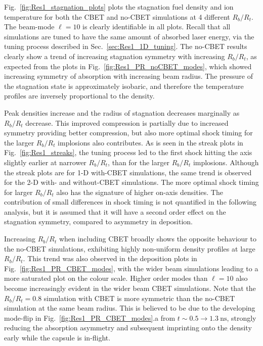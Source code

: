 Fig.~\ref{fig:Res1_stagnation_plots} plots the stagnation fuel density and ion temperature for both the \ac{CBET} and no-\ac{CBET} simulations at 4 different $R_b/R_t$.
The beam-mode $\ell=10$ is clearly identifiable in all plots.
Recall that all simulations are tuned to have the same amount of absorbed laser energy, via the tuning process described in Sec.~\ref{sec:Res1_1D_tuning}.
The no-\ac{CBET} results clearly show a trend of increasing stagnation symmetry with increasing $R_b/R_t$, as expected from the plots in Fig.~\ref{fig:Res1_PR_noCBET_modes}, which showed increasing symmetry of absorption with increasing beam radius.
The pressure of the stagnation state is approximately isobaric, and therefore the temperature profiles are inversely proportional to the density.

Peak densities increase and the radius of stagnation decreases marginally as $R_b/R_t$ decrease.
This improved compression is partially due to increased symmetry providing better compression, but also more optimal shock timing for the larger $R_b/R_t$ implosions also contributes.
As is seen in the streak plots in Fig.~\ref{fig:Res1_streaks}, the tuning process led to the first shock hitting the axis slightly earlier at narrower $R_b/R_t$, than for the larger $R_b/R_t$ implosions.
Although the streak plots are for 1-D with-\ac{CBET} simulations, the same trend is observed for the 2-D with- and without-\ac{CBET} simulations.
The more optimal shock timing for larger $R_b/R_t$ also has the signature of higher on-axis densities.
The contribution of small differences in shock timing is not quantified in the following analysis, but it is assumed that it will have a second order effect on the stagnation symmetry, compared to asymmetry in deposition.

Increasing $R_b/R_t$ when including \ac{CBET} broadly shows the opposite behaviour to the no-\ac{CBET} simulations, exhibiting highly non-uniform density profiles at large $R_b/R_t$.
This trend was also observed in the deposition plots in Fig.~\ref{fig:Res1_PR_CBET_modes}, with the wider beam simulations leading to a more saturated plot on the colour scale.
Higher order modes than $\ell=10$ also become increasingly evident in the wider beam \ac{CBET} simulations.
Note that the $R_b/R_t=0.8$ simulation with \ac{CBET} is more symmetric than the no-\ac{CBET} simulation at the same beam radius.
This is believed to be due to the developing mode-flip in Fig.~\ref{fig:Res1_PR_CBET_modes}.a from $t\sim 0.5\rightarrow 1.3\ \text{ns}$, strongly reducing the absorption asymmetry and subsequent imprinting onto the density early while the capsule is in-flight.


